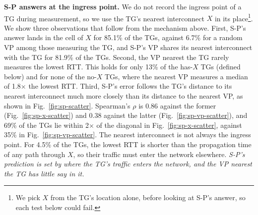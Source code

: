 \noindent \textbf{S-P answers at the ingress point.} We do not record the ingress point of a TG during measurement, so we use the TG's nearest interconnect $X$ in its place\footnote{We pick $X$ from the TG's location alone, before looking at S-P's answer, so each test below could fail.}. We show three observations that follow from the mechanism above. First, S-P's answer lands in the cell of $X$ for 85.1\% of the TGs, against 6.7\% for a random VP among those measuring the TG, and S-P's VP shares its nearest interconnect with the TG for 81.9\% of the TGs. Second, the VP nearest the TG rarely measures the lowest RTT. This holds for only 13\% of the has-$X$ TGs (defined below) and for none of the no-$X$ TGs, where the nearest VP measures a median of 1.8$\times$ the lowest RTT. Third, S-P's error follows the TG's distance to its nearest interconnect much more closely than its distance to the nearest VP, as shown in Fig.~\ref{fig:sp-scatter}. Spearman's $\rho$ is 0.86 against the former (Fig.~\ref{fig:sp-x-scatter}) and 0.38 against the latter (Fig.~\ref{fig:sp-vp-scatter}), and 69\% of the TGs lie within 2$\times$ of the diagonal in Fig.~\ref{fig:sp-x-scatter}, against 35\% in Fig.~\ref{fig:sp-vp-scatter}. The nearest interconnect is not always the ingress point. For 4.5\% of the TGs, the lowest RTT is shorter than the propagation time of any path through $X$, so their traffic must enter the network elsewhere. \emph{S-P's prediction is set by where the TG's traffic enters the network, and the VP nearest the TG has little say in it.}

